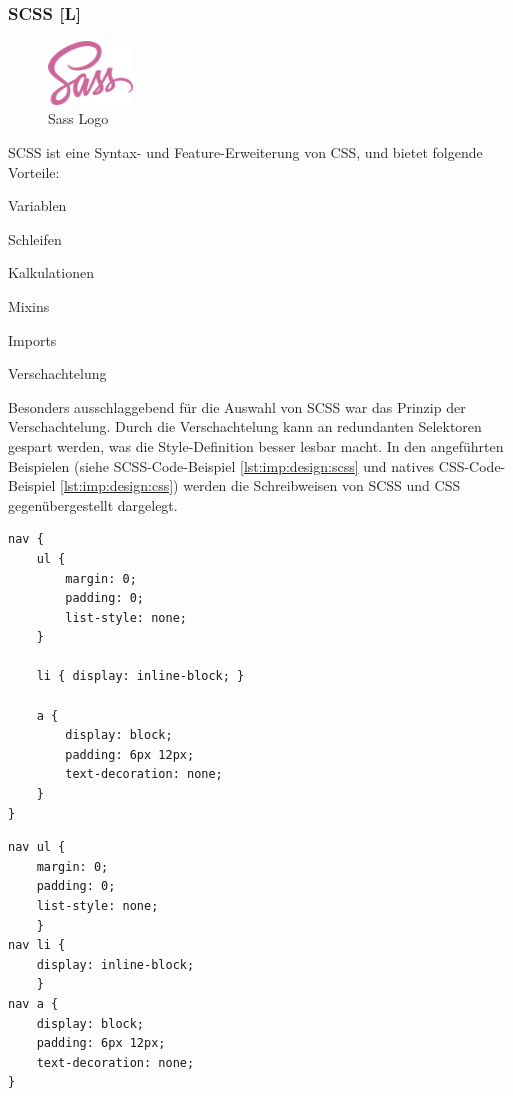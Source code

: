 \subsubsection{SCSS [L]}
\begin{figure}
  \begin{center}
    \includegraphics[width=0.2\textwidth]{pics/Sass_Logo.png}
   \caption{Sass Logo}
  \end{center}
\end{figure}
SCSS ist eine Syntax- und Feature-Erweiterung von CSS, und bietet folgende Vorteile:

\begin{compactitem}
  \item Variablen \cite{SassGuide}
  \item Schleifen \cite{SassGuide}
  \item Kalkulationen \cite{SassGuide}
  \item Mixins \cite{SassGuide}
  \item Imports \cite{SassGuide}
  \item Verschachtelung \cite{SassGuide}
\end{compactitem}

Besonders ausschlaggebend für die Auswahl von SCSS war das Prinzip der Verschachtelung. Durch die Verschachtelung kann an redundanten Selektoren gespart werden, was die Style-Definition besser lesbar macht. In den angeführten Beispielen (siehe SCSS-Code-Beispiel \ref{lst:imp:design:scss} und natives CSS-Code-Beispiel \ref{lst:imp:design:css}) werden die Schreibweisen von SCSS und CSS gegenübergestellt dargelegt. \cite{SassGuide}

\begin{lstlisting}[caption=SCSS - Code Beispiel \cite{SassGuide},label=lst:imp:design:scss]
nav {
    ul {
        margin: 0;
        padding: 0;
        list-style: none;
    }
    
    li { display: inline-block; }
    
    a {
        display: block;
        padding: 6px 12px;
        text-decoration: none;
    }
}
\end{lstlisting}

\begin{lstlisting}[caption=CSS - Code Beispiel \cite{SassGuide},label=lst:imp:design:css]
nav ul {
    margin: 0;
    padding: 0;
    list-style: none;
    }
nav li {
    display: inline-block;
    }
nav a {
    display: block;
    padding: 6px 12px;
    text-decoration: none;
}
\end{lstlisting}

